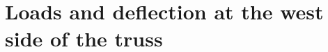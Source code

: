 \documentclass[
  letterpaper,
  DIV=11,
  numbers=noendperiod]{scrartcl}
\author{}
\date{}
\begin{document}
\Large 
\linespread{1.4}
\selectfont

\section{}\label{section}

\section{}\label{section-1}

\section{}\label{section-2}

\section{}\label{section-3}

\section{}\label{section-4}

\section{}\label{section-5}

\section{}\label{section-6}

\section{}\label{section-7}

\section{}\label{section-8}

\section{}\label{section-9}

\section{Loads and deflection at the west side of the
truss}\label{loads-and-deflection-at-the-west-side-of-the-truss}
\end{document}
